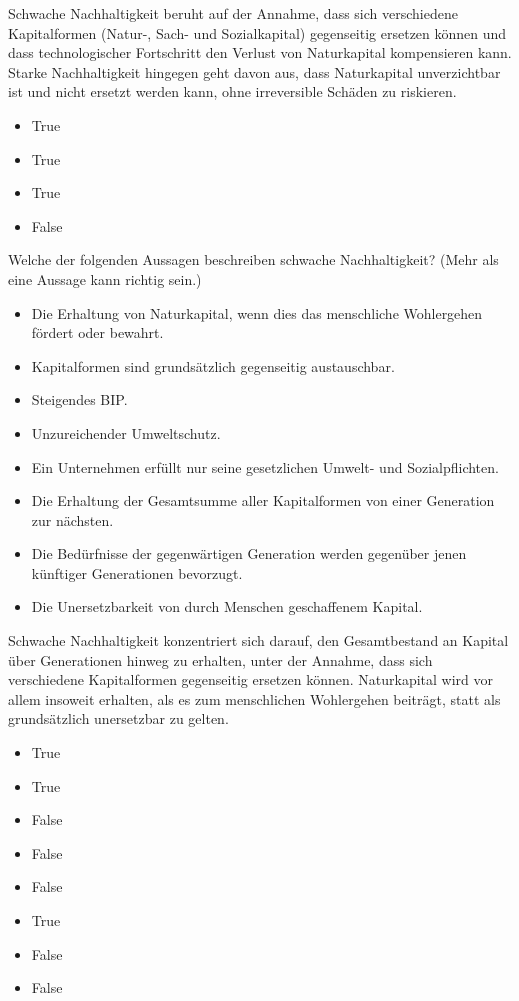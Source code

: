 \documentclass[
  nswissgerman,
  a4paper,
  openany]{book}
\providecommand{\tightlist}{%
  \setlength{\itemsep}{0pt}\setlength{\parskip}{0pt}}
\begin{document}
Schwache Nachhaltigkeit beruht auf der Annahme, dass sich verschiedene
Kapitalformen (Natur-, Sach- und Sozialkapital) gegenseitig ersetzen
können und dass technologischer Fortschritt den Verlust von Naturkapital
kompensieren kann. Starke Nachhaltigkeit hingegen geht davon aus, dass
Naturkapital unverzichtbar ist und nicht ersetzt werden kann, ohne
irreversible Schäden zu riskieren.

\begin{itemize}
\tightlist
\item
  True
\item
  True
\item
  True
\item
  False
\end{itemize}

Welche der folgenden Aussagen beschreiben schwache Nachhaltigkeit? (Mehr
als eine Aussage kann richtig sein.)

\begin{itemize}
\tightlist
\item[$\square$]
  Die Erhaltung von Naturkapital, wenn dies das menschliche Wohlergehen
  fördert oder bewahrt.
\item[$\square$]
  Kapitalformen sind grundsätzlich gegenseitig austauschbar.
\item[$\square$]
  Steigendes BIP.
\item[$\square$]
  Unzureichender Umweltschutz.
\item[$\square$]
  Ein Unternehmen erfüllt nur seine gesetzlichen Umwelt- und
  Sozialpflichten.
\item[$\square$]
  Die Erhaltung der Gesamtsumme aller Kapitalformen von einer Generation
  zur nächsten.
\item[$\square$]
  Die Bedürfnisse der gegenwärtigen Generation werden gegenüber jenen
  künftiger Generationen bevorzugt.
\item[$\square$]
  Die Unersetzbarkeit von durch Menschen geschaffenem Kapital.
\end{itemize}

Schwache Nachhaltigkeit konzentriert sich darauf, den Gesamtbestand an
Kapital über Generationen hinweg zu erhalten, unter der Annahme, dass
sich verschiedene Kapitalformen gegenseitig ersetzen können.
Naturkapital wird vor allem insoweit erhalten, als es zum menschlichen
Wohlergehen beiträgt, statt als grundsätzlich unersetzbar zu gelten.

\begin{itemize}
\tightlist
\item
  True
\item
  True
\item
  False
\item
  False
\item
  False
\item
  True
\item
  False
\item
  False
\end{itemize}
\end{document}
